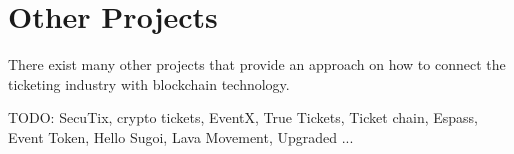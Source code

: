 \section{Other Projects}

There exist many other projects that provide an approach on how to connect the ticketing industry with blockchain technology.

TODO: SecuTix, crypto tickets, EventX, True Tickets, Ticket chain, Espass, Event Token, Hello Sugoi, Lava Movement, Upgraded ...

